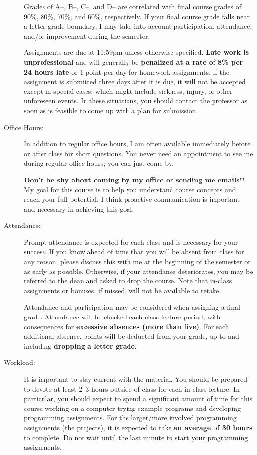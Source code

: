 \documentclass [letterpaper,11pt]{article}
\begin{document}
\begin{description}
Grades of A--, B--, C--, and D-- are correlated with final course grades of 90\%, 80\%,
70\%, and 60\%, respectively.  If your final course grade falls near a letter grade boundary,
I may take into account participation, attendance, and/or improvement during the semester.

Assignments are due at 11:59pm unless otherwise specified.  \textbf{Late work is unprofessional} and will generally be \textbf{penalized at a rate of 8\% per 24 hours late} or 1 point per day for homework assignments.  If the assignment is submitted three days after it is due, it will not be accepted except in special cases, which might include sickness, injury, or other unforeseen events. In these situations, you should contact the professor as soon as is feasible to come up with a plan for submission.

\item[Office Hours:]
In addition to regular office hours, I am often available immediately before or after class for 
short questions.  You never need an appointment to see me during regular office hours; you
can just come by.  

\textbf{Don't be shy about coming by my office or sending me emails!!}  My goal for this course is to help you understand course concepts and reach your full potential. I think proactive communication is important and necessary in achieving this goal.


\item[Attendance:]
Prompt attendance is expected for each class and is necessary for your success. If you know ahead of time that you will be
absent from class for any reason, please discuss this with me at the beginning of the semester
or as early as possible. Otherwise, if your attendance deteriorates, you may be referred to the dean and asked to drop the course. Note that in-class assignments or bonuses, if missed, will not be available to retake.

Attendance and participation may be considered when assigning a final grade.
Attendance will be checked each class lecture period, with consequences for \textbf{excessive absences (more than five)}.  For each additional absence, points will be deducted from your grade, up to and including \textbf{dropping a letter grade}.


\item[Workload:]
It is important to stay current with the material.  You should be prepared to devote at least 2--3 hours outside of class for each in-class lecture.  In particular, you should expect to spend a significant amount of time for this course working on a computer trying example programs and developing programming assignments. For the larger/more involved programming assignments (the projects), it is expected to take \textbf{an average of 30 hours} to complete. Do not wait until the last minute to start your programming assignments. 


\end{description}
\end{document}
